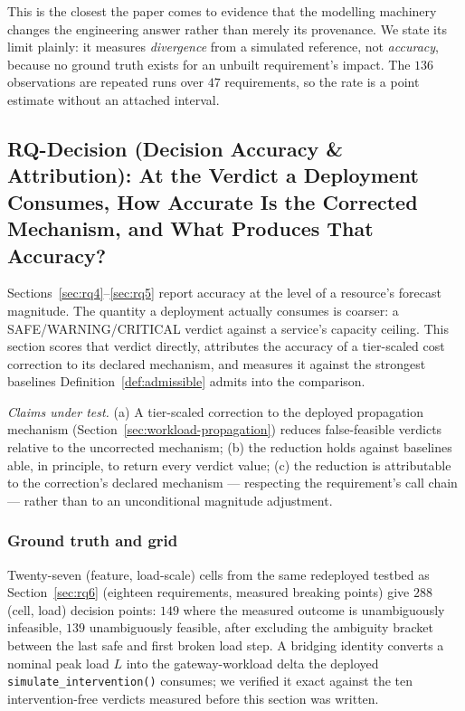 \documentclass[journal, 10pt]{IEEEtran}
\begin{document}
This is the closest the paper comes to evidence that the modelling machinery
changes the engineering answer rather than merely its provenance. We state its
limit plainly: it measures \emph{divergence} from a simulated reference, not
\emph{accuracy}, because no ground truth exists for an unbuilt requirement's
impact. The $136$ observations are repeated runs over $47$ requirements, so the
rate is a point estimate without an attached interval.


\subsection{RQ-Decision (Decision Accuracy \& Attribution): At the Verdict a Deployment Consumes, How Accurate Is the Corrected Mechanism, and What Produces That Accuracy?}
\label{sec:rq-decision}

Sections~\ref{sec:rq4}--\ref{sec:rq5} report accuracy at the level of a
resource's forecast magnitude. The quantity a deployment actually consumes is
coarser: a SAFE/WARNING/CRITICAL verdict against a service's capacity ceiling.
This section scores that verdict directly, attributes the accuracy of a
tier-scaled cost correction to its declared mechanism, and measures it against
the strongest baselines Definition~\ref{def:admissible} admits into the
comparison.

\emph{Claims under test.} (a) A tier-scaled correction to the deployed
propagation mechanism (Section~\ref{sec:workload-propagation}) reduces
false-feasible verdicts relative to the uncorrected mechanism; (b) the
reduction holds against baselines able, in principle, to return every verdict
value; (c) the reduction is attributable to the correction's declared
mechanism --- respecting the requirement's call chain --- rather than to an
unconditional magnitude adjustment.

\subsubsection{Ground truth and grid}
Twenty-seven (feature, load-scale) cells from the same redeployed testbed as
Section~\ref{sec:rq6} (eighteen requirements, measured breaking points) give
$288$ (cell, load) decision points: $149$ where the measured outcome is
unambiguously infeasible, $139$ unambiguously feasible, after excluding the
ambiguity bracket between the last safe and first broken load step. A bridging
identity converts a nominal peak load $L$ into the gateway-workload delta the
deployed \texttt{simulate\_intervention()} consumes; we verified it exact
against the ten intervention-free verdicts measured before this section was
written.
\end{document}
